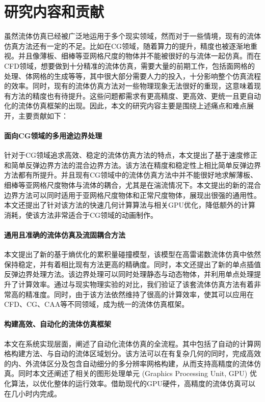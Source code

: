 \section{研究内容和贡献}
虽然流体仿真已经被广泛地运用于多个现实领域，然而对于一些情境，现有的流体仿真方法还有一定的不足。比如在CG领域，随着算力的提升，精度也被逐渐地重视。并且像薄板、细棒等亚网格尺度的物体并不能被很好的与流体一起仿真。而在CFD领域，想要做到十分精准的流体仿真，需要大量的前期工作，包括面网格的处理、体网格的生成等等，其中很大部分需要人力的投入，十分影响整个仿真流程的效率。同时，现有的流体仿真方法对一些物理现象无法很好的重现，这意味着现有方法的精度也有待提升。这些问题都需求有更高精度、更高效、更统一且更自动化的流体仿真框架的出现。因此，本文的研究内容主要是围绕上述痛点和难点展开，主要贡献如下：

\paragraph{面向CG领域的多用途边界处理}
针对于CG领域追求高效、稳定的流体仿真方法的特点，本文提出了基于速度修正和简单反弹边界方法的混合边界方法。该方法在精度和稳定性上相比简单反弹边界方法都有所提升。并且现有CG领域中的流体仿真方法中并不能很好地求解薄板、细棒等亚网格尺度物体与流体的耦合，尤其是在湍流情况下。本文提出的新的混合边界方法可以同时适用于亚网格尺度物体和正常尺度物体，展现出很强的通用性。本文还提出了针对该方法的快速几何计算算法与相关GPU优化，降低额外的计算消耗，使该方法非常适合于CG领域的动画制作。

\paragraph{通用且准确的流体仿真及流固耦合方法}
本文提出了新的基于熵优化的累积量碰撞模型，该模型在高雷诺数流体仿真中依然保持稳定，并有着相比现有方法更高的精确度。同时，本文还提出了新的单点插值反弹边界处理方法。该边界处理可以同时处理静态与动态物体，并利用单点处理提升了计算效率。通过与现实物理实验的对比，我们验证了该套流体仿真方法有着非常高的精准度。同时，由于该方法依然维持了很高的计算效率，使其可以应用在CFD、CG、CAA等不同领域，成为统一的流体仿真框架。

\paragraph{构建高效、自动化的流体仿真框架}
本文在系统实现层面，阐述了自动化流体仿真的全流程。其中包括了自动的计算网格构建方法、与自动的流体区域划分。该方法可以在有复杂几何的同时，完成高效的内、外流体区分及包含自动细分的多分辨率网格构建，从而支持高精度的流体仿真。同时本文还阐述了相关的图形处理单元 (Graphics Processing Unit, GPU) 优化算法，以优化整体的运行效率。借助现代的GPU硬件，高精度的流体仿真可以在几小时内完成。


